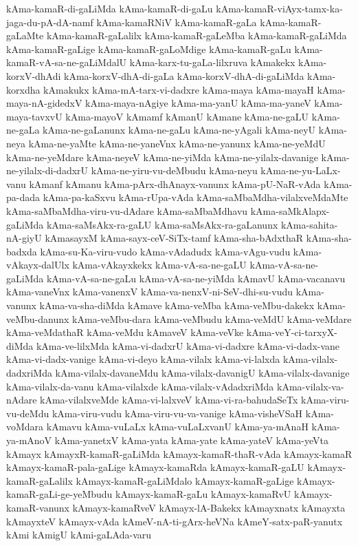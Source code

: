 {kAma-kamaR-di-gaLiMda
kAma-kamaR-di-gaLu
kAma-kamaR-viAyx-tamx-ka-jaga-du-pA-dA-namf
kAma-kamaRNiV
kAma-kamaR-gaLa
kAma-kamaR-gaLaMte
kAma-kamaR-gaLalilx
kAma-kamaR-gaLeMba
kAma-kamaR-gaLiMda
kAma-kamaR-gaLige
kAma-kamaR-gaLoMdige
kAma-kamaR-gaLu
kAma-kamaR-vA-sa-ne-gaLiMdalU
kAma-karx-tu-gaLa-lilxruva
kAmakekx
kAma-korxV-dhAdi
kAma-korxV-dhA-di-gaLa
kAma-korxV-dhA-di-gaLiMda
kAma-korxdha
kAmakukx
kAma-mA-tarx-vi-dadxre
kAma-maya
kAma-mayaH
kAma-maya-nA-gidedxV
kAma-maya-nAgiye
kAma-ma-yanU
kAma-ma-yaneV
kAma-maya-tavxvU
kAma-mayoV
kAmamf
kAmanU
kAmane
kAma-ne-gaLU
kAma-ne-gaLa
kAma-ne-gaLanunx
kAma-ne-gaLu
kAma-ne-yAgali
kAma-neyU
kAma-neya
kAma-ne-yaMte
kAma-ne-yaneVnx
kAma-ne-yanunx
kAma-ne-yeMdU
kAma-ne-yeMdare
kAma-neyeV
kAma-ne-yiMda
kAma-ne-yilalx-davanige
kAma-ne-yilalx-di-dadxrU
kAma-ne-yiru-vu-deMbudu
kAma-neyu
kAma-ne-yu-LaLx-vanu
kAmanf
kAmanu
kAma-pArx-dhAnayx-vanunx
kAma-pU-NaR-vAda
kAma-pa-dada
kAma-pa-kaSxvu
kAma-rUpa-vAda
kAma-saMbaMdha-vilalxveMdaMte
kAma-saMbaMdha-viru-vu-dAdare
kAma-saMbaMdhavu
kAma-saMkAlapx-gaLiMda
kAma-saMsAkx-ra-gaLU
kAma-saMsAkx-ra-gaLanunx
kAma-sahita-nA-giyU
kAmasayxM
kAma-sayx-ceV-SiTx-tamf
kAma-sha-bAdxthaR
kAma-sha-badxda
kAma-su-Ka-viru-vudo
kAma-vAdadudx
kAma-vAgu-vudu
kAma-vAkayx-dalUlx
kAma-vAkayxkekx
kAma-vA-sa-ne-gaLU
kAma-vA-sa-ne-gaLiMda
kAma-vA-sa-ne-gaLu
kAma-vA-sa-ne-yiMda
kAmavU
kAma-vacanavu
kAma-vaneVnx
kAma-vanenxV
kAma-va-nenxV-ni-SeV-dhi-su-vudu
kAma-vanunx
kAma-va-sha-diMda
kAmave
kAma-veMba
kAma-veMbu-dakekx
kAma-veMbu-danunx
kAma-veMbu-dara
kAma-veMbudu
kAma-veMdU
kAma-veMdare
kAma-veMdathaR
kAma-veMdu
kAmaveV
kAma-veVke
kAma-veY-ci-tarxyX-diMda
kAma-ve-lilxMda
kAma-vi-dadxrU
kAma-vi-dadxre
kAma-vi-dadx-vane
kAma-vi-dadx-vanige
kAma-vi-deyo
kAma-vilalx
kAma-vi-lalxda
kAma-vilalx-dadxriMda
kAma-vilalx-davaneMdu
kAma-vilalx-davanigU
kAma-vilalx-davanige
kAma-vilalx-da-vanu
kAma-vilalxde
kAma-vilalx-vAdadxriMda
kAma-vilalx-va-nAdare
kAma-vilalxveMde
kAma-vi-lalxveV
kAma-vi-ra-bahudaSeTx
kAma-viru-vu-deMdu
kAma-viru-vudu
kAma-viru-vu-va-vanige
kAma-visheVSaH
kAma-voMdara
kAmavu
kAma-vuLaLx
kAma-vuLaLxvanU
kAma-ya-mAnaH
kAma-ya-mAnoV
kAma-yanetxV
kAma-yata
kAma-yate
kAma-yateV
kAma-yeVta
kAmayx
kAmayxR-kamaR-gaLiMda
kAmayx-kamaR-thaR-vAda
kAmayx-kamaR
kAmayx-kamaR-pala-gaLige
kAmayx-kamaRda
kAmayx-kamaR-gaLU
kAmayx-kamaR-gaLalilx
kAmayx-kamaR-gaLiMdalo
kAmayx-kamaR-gaLige
kAmayx-kamaR-gaLi-ge-yeMbudu
kAmayx-kamaR-gaLu
kAmayx-kamaRvU
kAmayx-kamaR-vanunx
kAmayx-kamaRveV
kAmayx-lA-Bakekx
kAmayxnatx
kAmayxta
kAmayxteV
kAmayx-vAda
kAmeV-nA-ti-gArx-heVNa
kAmeY-satx-paR-yanutx
kAmi
kAmigU
kAmi-gaLAda-varu
}
